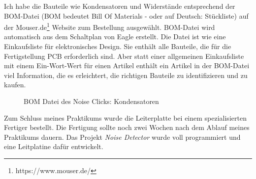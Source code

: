 Ich habe die Bauteile wie Kondensatoren und Widerstände entsprechend der BOM-Datei (BOM bedeutet Bill Of Materials - oder auf Deutsch: Stückliste) auf der Mouser.de\footnote{https://www.mouser.de/} Website zum Bestellung ausgewählt. BOM-Datei wird automatisch aus dem Schaltplan von Eagle erstellt. Die Datei ist wie eine Einkaufsliste für elektronisches Design. Sie enthält alle Bauteile, die für die Fertigstellung PCB erforderlich sind. Aber statt einer allgemeinen Einkaufsliste mit einem Ein-Wort-Wert für einen Artikel enthält ein Artikel in der BOM-Datei viel Information, die es erleichtert, die richtigen Bauteile zu identifizieren und zu kaufen.

\begin{figure}[ht]
	\centering
	\caption{BOM Datei des Noise Clicks: Kondensatoren}
	\label{fig:bom}
\end{figure}

Zum Schluss meines Praktikums wurde die Leiterplatte bei einem spezialisierten Fertiger bestellt. Die Fertigung sollte noch zwei Wochen nach dem Ablauf meines Praktikums dauern. Das Projekt \textit{Noise Detector} wurde voll programmiert und eine Leitplatine dafür entwickelt. 